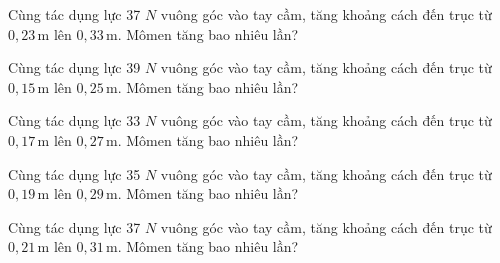 \begin{bt}
Cùng tác dụng lực 37 $N$ vuông góc vào tay cầm, tăng khoảng cách đến trục từ $0,23\,\text{m}$ lên $0,33\,\text{m}$. Mômen tăng bao nhiêu lần?
\end{bt}

\begin{bt}
Cùng tác dụng lực 39 $N$ vuông góc vào tay cầm, tăng khoảng cách đến trục từ $0,15\,\text{m}$ lên $0,25\,\text{m}$. Mômen tăng bao nhiêu lần?
\end{bt}

\begin{bt}
Cùng tác dụng lực 33 $N$ vuông góc vào tay cầm, tăng khoảng cách đến trục từ $0,17\,\text{m}$ lên $0,27\,\text{m}$. Mômen tăng bao nhiêu lần?
\end{bt}

\begin{bt}
Cùng tác dụng lực 35 $N$ vuông góc vào tay cầm, tăng khoảng cách đến trục từ $0,19\,\text{m}$ lên $0,29\,\text{m}$. Mômen tăng bao nhiêu lần?
\end{bt}

\begin{bt}
Cùng tác dụng lực 37 $N$ vuông góc vào tay cầm, tăng khoảng cách đến trục từ $0,21\,\text{m}$ lên $0,31\,\text{m}$. Mômen tăng bao nhiêu lần?
\end{bt}
